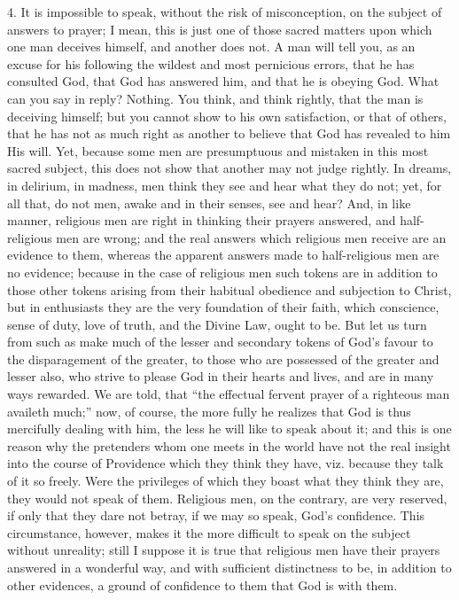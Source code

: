 4. It is impossible to speak, without the risk of misconception, on
the subject of answers to prayer; I mean, this is just one of those
sacred matters upon which one man deceives himself, and another does
not. A man will tell you, as an excuse for his following the wildest
and most pernicious errors, that he has consulted God, that God has
answered him, and that he is obeying God. What can you say in reply?
Nothing. You think, and think rightly, that the man is deceiving
himself; but you cannot show to his own satisfaction, or that of
others, that he has not as much right as another to believe that God
has revealed to him His will. Yet, because some men are presumptuous
and mistaken in this most sacred subject, this does not show that
another may not judge rightly. In dreams, in delirium, in madness, men
think they see and hear what they do not; yet, for all that, do not
men, awake and in their senses, see and hear? And, in like manner,
religious men are right in thinking their prayers answered, and
half-religious men are wrong; and the real answers which religious men
receive are an evidence to them, whereas the apparent answers made to
half-religious men are no evidence; because in the case of religious
men such tokens are in addition to those other tokens arising from
their habitual obedience and subjection to Christ, but in enthusiasts
they are the very foundation of their faith, which conscience, sense
of duty, love of truth, and the Divine Law, ought to be. But let us
turn from such as make much of the lesser and secondary tokens of
God's favour to the disparagement of the greater, to those who are
possessed of the greater and lesser also, who strive to please God in
their hearts and lives, and are in many ways rewarded. We are told,
that ``the effectual fervent prayer of a righteous man availeth
much;'' now, of course, the more fully he realizes that God is
thus mercifully dealing with him, the less he will like to speak about
it; and this is one reason why the pretenders whom one meets in the
world have not the real insight into the course of Providence which
they think they have, viz. because they talk of it so freely. Were the
privileges of which they boast what they think they are, they would
not speak of them. Religious men, on the contrary, are very reserved,
if only that they dare not betray, if we may so speak, God's
confidence. This circumstance, however, makes it the more difficult to
speak on the subject without unreality; still I suppose it is true
that religious men have their prayers answered in a wonderful way, and
with sufficient distinctness to be, in addition to other evidences, a
ground of confidence to them that God is with them.

